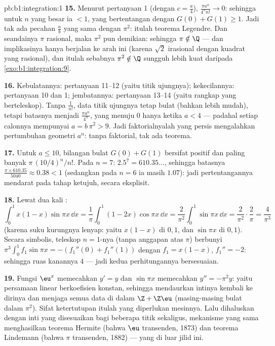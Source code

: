 \begin{solution}{pb:b1:integration:1}
\textbf{15.} Menurut pertanyaan 1 (dengan $c = \frac a4$),
$\frac{\pi a^n}{4^n n!} \to 0$: sehingga untuk $n$ yang besar ia $< 1$,
yang bertentangan dengan $G(0) + G(1) \geq 1$. Jadi tak ada pecahan $\frac ab$
yang sama dengan $\pi^2$: itulah teorema Legendre. Dan seandainya $\pi$ rasional,
maka $\pi^2$ pun demikian: sehingga $\pi \notin \Q$ --- dan implikasinya
hanya berjalan ke arah ini (karena $\sqrt2$ irasional dengan kuadrat yang
rasional), dan itulah sebabnya $\pi^2 \notin \Q$ sungguh lebih kuat
daripada \cref{exo:b1:integration:9}.

\textbf{16.} Kebulatannya: pertanyaan 11--12 (yaitu 
titik ujungnya); kekecilannya: pertanyaan 10 dan 1; jembatannya: pertanyaan
13--14 (yaitu  rangkap yang berteleskop). Tanpa
$\frac{1}{n!}$, data titik ujungnya tetap bulat (bahkan lebih
mudah), tetapi batasnya menjadi $\frac{\pi a^n}{4^n}$, yang
menuju $0$ hanya ketika $a < 4$ --- padahal setiap calonnya mempunyai $a =
b\,\pi^2 > 9$. Jadi faktorialnyalah yang persis mengalahkan
pertumbuhan geometri $a^n$: tanpa faktorial, tak ada teorema.

\textbf{17.} Untuk $a \leq 10$, bilangan bulat $G(0) + G(1)$ bersifat
positif dan paling banyak $\pi\,(10/4)^n/n!$. Pada $n = 7$:
$2.5^7 = 610.35\dots$, sehingga batasnya $\frac{\pi \times
610.35}{5040} \approx 0.38 < 1$ (sedangkan pada $n = 6$ ia masih
$1.07$): jadi pertentangannya mendarat pada tahap ketujuh,
secara eksplisit.

\textbf{18.} Lewat dua kali :
\[
\int_0^1 x(1-x)\sin\pi x\,\dd x
= \frac1\pi\int_0^1 (1 - 2x)\cos\pi x\,\dd x
= \frac{2}{\pi^2}\int_0^1 \sin\pi x\,\dd x
= \frac{2}{\pi^2}\cdot\frac{2}{\pi} = \frac{4}{\pi^3}
\]
(karena suku kurungnya lenyap: yaitu $x(1-x)$ di $0, 1$, dan $\sin\pi x$
di $0, 1$). Secara simbolis, teleskop $n = 1$-nya (tanpa anggapan
atas $\pi$) berbunyi $\pi^3\int_0^1 f_1\sin\pi x = -(f_1''(0) +
f_1''(1))$ dengan $f_1 = x(1 - x)$, $f_1'' = -2$: sehingga ruas kanannya $4$
--- jadi kedua perhitungannya bersesuaian.

\textbf{19.} Fungsi $\eu^x$ memecahkan $y' = y$ dan $\sin\pi x$ memecahkan
$y'' = -\pi^2 y$: yaitu persamaan linear berkoefisien konstan,
sehingga  mendaurkan intinya kembali ke dirinya dan
menjaga semua data  di dalam $\Z + \Z\eu$ (masing-masing 
bulat dalam $\pi^2$). Sifat ketertutupan itulah yang diperlukan
mesinnya. Lalu dihaluskan dengan inti yang disesuaikan bagi beberapa titik
sekaligus, mekanisme yang sama menghasilkan teorema Hermite (bahwa $\eu$
transenden, 1873) dan teorema Lindemann (bahwa $\pi$ transenden,
1882) --- yang di luar jilid ini.


\end{solution}
